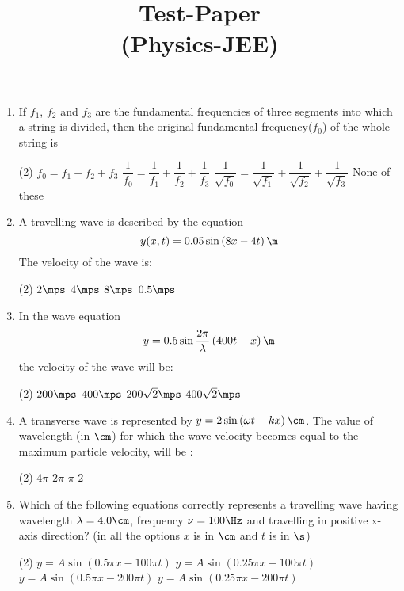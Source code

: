 \documentclass{article}
\title{Test-Paper\\(Physics-JEE)}
\renewcommand{\ans}{\quad}
\begin{document}
\maketitle

\jeeSectionA
\begin{enumerate}
\item If $f_1$, $f_2$ and $f_3$ are the fundamental frequencies of three segments into which a string is divided, then the original fundamental frequency($f_0$) of the whole string is
	\begin{tasks}(2)
		\task $f_0 = f_1 + f_2 + f_3$
		\task $\dfrac{1}{f_0} = \dfrac{1}{f_1} + \dfrac{1}{f_2} + \dfrac{1}{f_3}$\ans
		\task $\dfrac{1}{\sqrt{f_0}} = \dfrac{1}{\sqrt{f_1}} + \dfrac{1}{\sqrt{f_2}} + \dfrac{1}{\sqrt{f_3}}$
		\task None of these
	\end{tasks}



\item A travelling wave is described by the equation\[ y(x, t) = 0.05\sin\left(8x-4t\right)\m\] The velocity of the wave is:
	\begin{tasks}(2)
		\task $2\mps$
		\task $4\mps$
		\task $8\mps$
		\task $0.5\mps$\ans
	\end{tasks}

\item In the wave equation \[ y=0.5\sin\dfrac{2\pi}{\lambda}\left(400t-x\right) \m\] the velocity of the wave will be:
	\begin{tasks}(2)
		\task $200\mps$
		\task $400\mps$\ans
		\task $200\sqrt{2}\mps$
		\task $400\sqrt{2}\mps$
	\end{tasks}

\item A transverse wave is represented by $y=2\sin\left(\omega t -k x\right) \cm$. The value of wavelength (in $\cm$) for which the wave velocity becomes equal to the maximum particle velocity, will be :
	\begin{tasks}(2)
		\task $4\pi$\ans
		\task $2\pi$
		\task $\pi$
		\task $2$
	\end{tasks}

\item Which of the following equations correctly represents a travelling wave having wavelength $\lambda= 4.0 \cm$, frequency $\nu = 100 \Hz$ and travelling in positive x-axis direction? (in all the options $x$ is in $\cm$ and $t$ is in $\s$)
	\begin{tasks}(2)
		\task $y= A\sin\left(0.5\pi x - 100\pi t\right)$
		\task $y= A\sin\left(0.25\pi x - 100\pi t\right)$
		\task $y= A\sin\left(0.5\pi x - 200\pi t\right)$\ans
		\task $y= A\sin\left(0.25\pi x - 200\pi t\right)$
	\end{tasks}


\end{enumerate}
\end{document}
